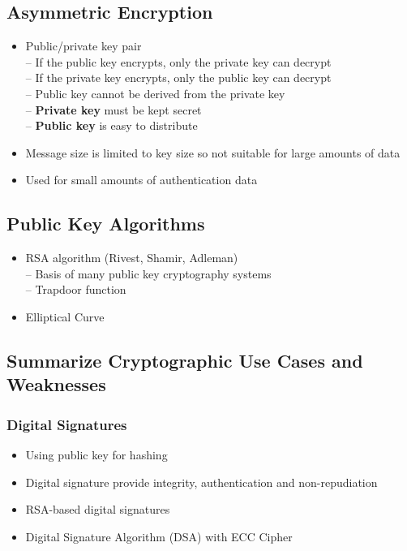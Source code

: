 	\subsection {Asymmetric Encryption}
		\begin{itemize}
			\item Public/private key pair \\
				-- If the public key encrypts, only the private key can decrypt \\
				-- If the private key encrypts, only the public key can decrypt \\
				-- Public key cannot be derived from the private key \\
				-- \textbf{Private key} must be kept secret \\
				-- \textbf{Public key} is easy to distribute
			\item Message size is limited to key size so not suitable for large amounts
				of data
			\item Used for small amounts of authentication data
		\end{itemize}
	\subsection {Public Key Algorithms}
		\begin{itemize}
			\item RSA algorithm (Rivest, Shamir, Adleman) \\
				-- Basis of many public key cryptography systems \\
				-- Trapdoor function
			\item Elliptical Curve
		\end{itemize}
	\subsection {Summarize Cryptographic Use Cases and Weaknesses}
		\subsubsection {Digital Signatures}
			\begin{itemize}
				\item Using public key for hashing
				\item Digital signature provide integrity, authentication and
					non-repudiation
				\item RSA-based digital signatures
				\item Digital Signature Algorithm (DSA) with ECC Cipher
			\end{itemize}
